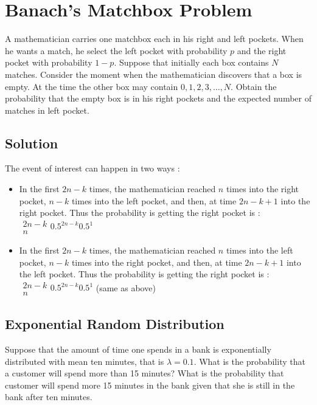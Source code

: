 \documentclass[12pt,a4paper]{article}
\begin{document}
\section{Banach's Matchbox Problem}

A mathematician carries one matchbox each in his right and left pockets. When he wants a match, he select the left pocket with probability $p$ and the right pocket with probability $1-p$. Suppose that initially each box contains $N$ matches. Consider the moment when the mathematician discovers that a box is empty. At the time the other box may contain $0,1,2,3,\dots,N$. Obtain the probability that the empty box is in his right pockets and the expected number of matches in left pocket.


\subsection{Solution}

The event of interest can happen in two ways :
\begin{itemize}
\item In the first $2n-k$ times, the mathematician reached $n$ times into the right pocket, $n-k$ times into the left pocket, and then, at time $2n-k+1$ into the right pocket. Thus the probability is getting the right pocket is : $\begin{array}{c}2n-k\\n\end{array}0.5^{2n-k}0.5^1$
\item In the first $2n-k$ times, the mathematician reached $n$ times into the left pocket, $n-k$ times into the right pocket, and then, at time $2n-k+1$ into the left pocket. Thus the probability is getting the right pocket is : $\begin{array}{c}2n-k\\n\end{array}0.5^{2n-k}0.5^1$ (same as above)

\end{itemize}

\subsection{Exponential Random Distribution}

Suppose that the amount of time one spends in a bank is exponentially distributed with mean ten minutes, that is $\lambda=0.1$. What is the probability that a customer will spend more than 15 minutes? What is the probability that customer will spend more 15 minutes in the bank given that she is still in the bank after ten minutes.
\end{document}
